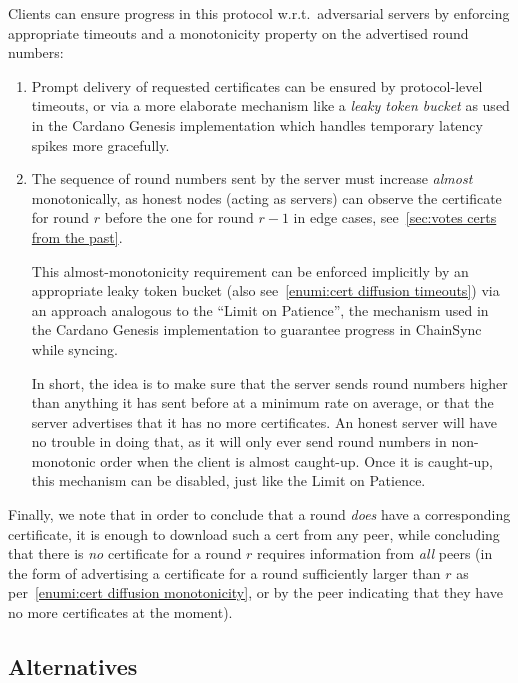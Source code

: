 Clients can ensure progress in this protocol w.r.t.\ adversarial servers by enforcing appropriate timeouts and a monotonicity property on the advertised round numbers:
\begin{enumerate}
\item\label{enumi:cert diffusion timeouts}
  Prompt delivery of requested certificates can be ensured by protocol-level timeouts, or via a more elaborate mechanism like a \emph{leaky token bucket} as used in the Cardano Genesis implementation  \parencite{genesis-implementation-documentation} which handles temporary latency spikes more gracefully.
\item\label{enumi:cert diffusion monotonicity}
  The sequence of round numbers sent by the server must increase \emph{almost} monotonically, as honest nodes (acting as servers) can observe the certificate for round $r$ before the one for round $r-1$ in edge cases, see~\cref{sec:votes certs from the past}.

  This almost-monotonicity requirement can be enforced implicitly by an appropriate leaky token bucket (also see~\ref{enumi:cert diffusion timeouts}) via an approach analogous to the \enquote{Limit on Patience}, the mechanism used in the Cardano Genesis implementation \parencite{genesis-implementation-documentation} to guarantee progress in ChainSync while syncing.

  In short, the idea is to make sure that the server sends round numbers higher than anything it has sent before at a minimum rate on average, or that the server advertises that it has no more certificates.
  An honest server will have no trouble in doing that, as it will only ever send round numbers in non-monotonic order when the client is almost caught-up.
  Once it is caught-up, this mechanism can be disabled, just like the Limit on Patience.
\end{enumerate}

Finally, we note that in order to conclude that a round \emph{does} have a corresponding certificate, it is enough to download such a cert from any peer, while concluding that there is \emph{no} certificate for a round $r$ requires information from \emph{all} peers (in the form of advertising a certificate for a round sufficiently larger than $r$ as per~\ref{enumi:cert diffusion monotonicity}, or by the peer indicating that they have no more certificates at the moment).

\subsection{Alternatives}\label{sec:vote cert alternatives}

